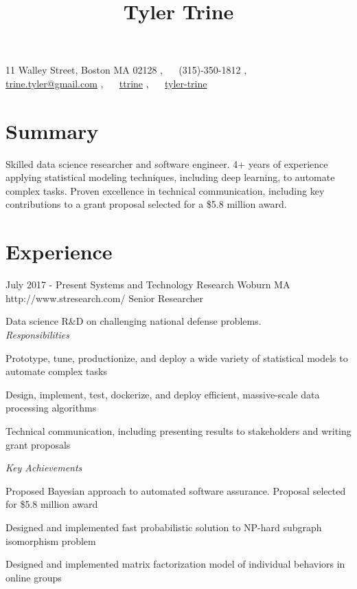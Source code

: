 \documentclass[10pt]{article}
\begin{document}
\title{Tyler Trine}
11 Walley Street, Boston MA 02128 \sep
{~{\faMobile}~}  (315)-350-1812 \sep
{~{\footnotesize\faEnvelopeO}~} \href{mailto:trine.tyler@gmail.com}{trine.tyler@gmail.com} \sep
{~\faGithub~} \href{https://github.com/ttrine}{ttrine} \sep
{~\small\faLinkedin~} \href{https://www.linkedin.com/in/tyler-trine/}{tyler-trine}

\section{Summary} Skilled data science researcher and software engineer. 4+ years of experience applying statistical modeling techniques, including deep learning, to automate complex tasks. Proven excellence in technical communication, including key contributions to a grant proposal selected for a \$5.8 million award.

\section{Experience}
	\job %
		{July 2017 - Present}
		{Systems and Technology Research}
		{Woburn MA}
		{http://www.stresearch.com/}
		{Senior Researcher}
		{Data science R\&D on challenging national defense problems. \\

		\vspace{-7pt}
		\textit{Responsibilities}
		\begin{itemize-noindent}
			\vspace{7pt}
			\item Prototype, tune, productionize, and deploy a wide variety of statistical models to automate complex tasks
			\item Design, implement, test, dockerize, and deploy efficient, massive-scale data processing algorithms
			\item Technical communication, including presenting results to stakeholders and writing grant proposals
		\end{itemize-noindent}

		\textit{Key Achievements}
		\begin{itemize-noindent}
			\vspace{7pt}
			\item Proposed Bayesian approach to automated software assurance. Proposal selected for \$5.8 million award
			\item Designed and implemented fast probabilistic solution to NP-hard subgraph isomorphism problem
			\item Designed and implemented matrix factorization model of individual behaviors in online groups
		\end{itemize-noindent}}
\end{document}
